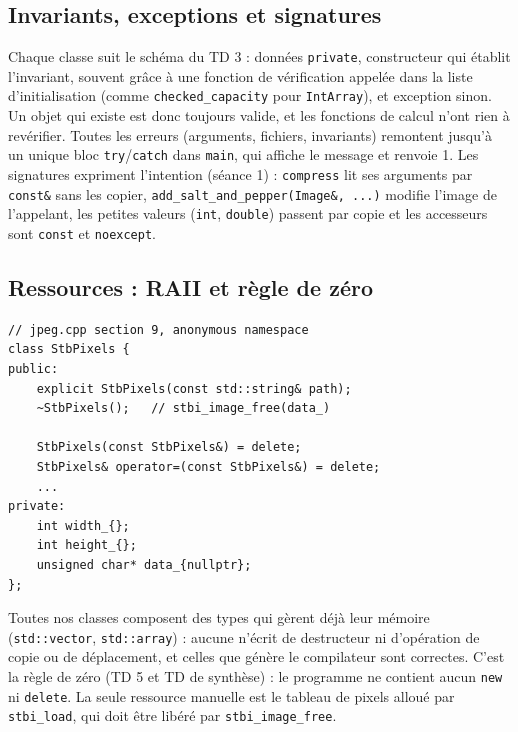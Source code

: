 \documentclass[10pt,a4paper]{article}
\newcommand{\code}[1]{\texttt{#1}}
\begin{document}
\subsection{Invariants, exceptions et signatures}
Chaque classe suit le schéma du TD 3 : données \code{private}, constructeur qui établit
l'invariant, souvent grâce à une fonction de vérification appelée dans la liste d'initialisation
(comme \code{checked\_capacity} pour \code{IntArray}), et exception sinon. Un objet qui existe
est donc toujours valide, et les fonctions de calcul n'ont rien à revérifier. Toutes les erreurs
(arguments, fichiers, invariants) remontent jusqu'à un unique bloc \code{try}/\code{catch} dans
\code{main}, qui affiche le message et renvoie 1. Les signatures expriment l'intention
(séance 1) : \code{compress} lit ses arguments par \code{const\&} sans les copier,
\code{add\_salt\_and\_pepper(Image\&, ...)} modifie l'image de l'appelant, les petites valeurs
(\code{int}, \code{double}) passent par copie et les accesseurs sont \code{const} et
\code{noexcept}.

\subsection{Ressources : RAII et règle de zéro}
\begin{minipage}[t]{0.45\textwidth}
\vspace{0pt}
\begin{lstlisting}
// jpeg.cpp section 9, anonymous namespace
class StbPixels {
public:
    explicit StbPixels(const std::string& path);
    ~StbPixels();   // stbi_image_free(data_)

    StbPixels(const StbPixels&) = delete;
    StbPixels& operator=(const StbPixels&) = delete;
    ...
private:
    int width_{};
    int height_{};
    unsigned char* data_{nullptr};
};
\end{lstlisting}
\end{minipage}\hfill
\begin{minipage}[t]{0.525\textwidth}
\vspace{0pt}
Toutes nos classes composent des types qui gèrent déjà leur mémoire (\code{std::vector},
\code{std::array}) : aucune n'écrit de destructeur ni d'opération de copie ou de déplacement, et
celles que génère le compilateur sont correctes. C'est la règle de zéro (TD 5 et TD de
synthèse) : le programme ne contient aucun \code{new} ni \code{delete}. La seule ressource
manuelle est le tableau de pixels alloué par \code{stbi\_load}, qui doit être libéré par
\code{stbi\_image\_free}.
\end{minipage}
\end{document}
